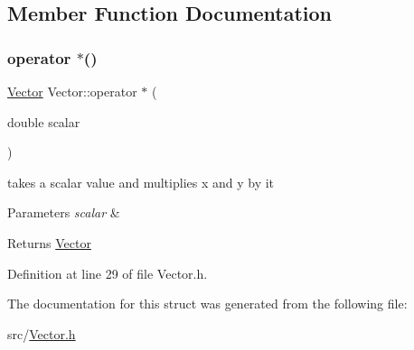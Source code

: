 \subsection{Member Function Documentation}
\mbox{\label{struct_vector_a4f5f72401cce567d96b50b95109c9bb3}} 
\subsubsection{\texorpdfstring{operator $\ast$()}{operator *()}}
{\footnotesize\ttfamily \mbox{\hyperlink{struct_vector}{Vector}} Vector\+::operator $\ast$ (\begin{DoxyParamCaption}\item[{double}]{scalar }\end{DoxyParamCaption})\hspace{0.3cm}{\ttfamily [inline]}}



takes a scalar value and multiplies x and y by it 


\begin{DoxyParams}{Parameters}
{\em scalar} & \\
\hline
\end{DoxyParams}
\begin{DoxyReturn}{Returns}
\mbox{\hyperlink{struct_vector}{Vector}} 
\end{DoxyReturn}


Definition at line 29 of file Vector.\+h.


\begin{DoxyCode}{0}

\end{DoxyCode}


The documentation for this struct was generated from the following file\+:\begin{DoxyCompactItemize}
\item 
src/\mbox{\hyperlink{_vector_8h}{Vector.\+h}}\end{DoxyCompactItemize}
